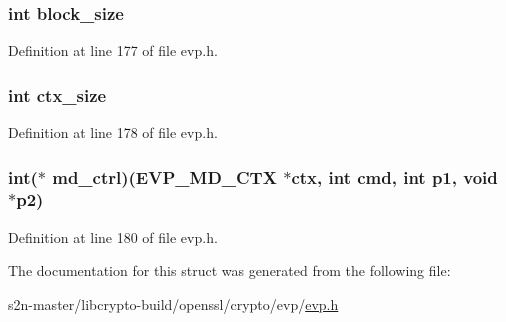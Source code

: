 \subsubsection[{\texorpdfstring{block\+\_\+size}{block_size}}]{\setlength{\rightskip}{0pt plus 5cm}int block\+\_\+size}\hypertarget{structenv__md__st_a70b27761c7d0bd5cd90f4fe47e569b94}{}\label{structenv__md__st_a70b27761c7d0bd5cd90f4fe47e569b94}


Definition at line 177 of file evp.\+h.

\subsubsection[{\texorpdfstring{ctx\+\_\+size}{ctx_size}}]{\setlength{\rightskip}{0pt plus 5cm}int ctx\+\_\+size}\hypertarget{structenv__md__st_a283e909780db477722c366b5e1425f7d}{}\label{structenv__md__st_a283e909780db477722c366b5e1425f7d}


Definition at line 178 of file evp.\+h.

\subsubsection[{\texorpdfstring{md\+\_\+ctrl}{md_ctrl}}]{\setlength{\rightskip}{0pt plus 5cm}int($\ast$ md\+\_\+ctrl)({\bf E\+V\+P\+\_\+\+M\+D\+\_\+\+C\+TX} $\ast$ctx, int cmd, int p1, {\bf void} $\ast$p2)}\hypertarget{structenv__md__st_ac37e525c46d80be4d6d81186a42222e3}{}\label{structenv__md__st_ac37e525c46d80be4d6d81186a42222e3}


Definition at line 180 of file evp.\+h.



The documentation for this struct was generated from the following file\+:\begin{DoxyCompactItemize}
\item 
s2n-\/master/libcrypto-\/build/openssl/crypto/evp/\hyperlink{crypto_2evp_2evp_8h}{evp.\+h}\end{DoxyCompactItemize}
